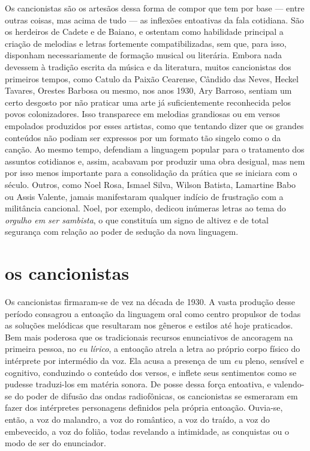 Os cancionistas são os artesãos dessa forma de compor que tem por base
--- entre outras coisas, mas acima de tudo --- as inflexões entoativas
da fala cotidiana. São os herdeiros de Cadete e de Baiano, e ostentam
como habilidade principal a criação de melodias e letras fortemente
compatibilizadas, sem que, para isso, disponham necessariamente de
formação musical ou literária. Embora nada devessem à tradição escrita
da música e da literatura, muitos cancionistas dos primeiros tempos,
como Catulo da Paixão Cearense, Cândido das Neves, Heckel Tavares,
Orestes Barbosa ou mesmo, nos anos 1930, Ary Barroso, sentiam um certo
desgosto por não praticar uma arte já suficientemente reconhecida pelos
povos colonizadores. Isso transparece em melodias grandiosas ou em
versos empolados produzidos por esses artistas, como que tentando dizer
que os grandes conteúdos não podiam ser expressos por um formato tão
singelo como o da canção. Ao mesmo tempo, defendiam a linguagem popular
para o tratamento dos assuntos cotidianos e, assim, acabavam por
produzir uma obra desigual, mas nem por isso menos importante para a
consolidação da prática que se iniciara com o século. Outros, como Noel
Rosa, Ismael Silva, Wilson Batista, Lamartine Babo ou Assis Valente,
jamais manifestaram qualquer indício de frustração com a militância
cancional. Noel, por exemplo, dedicou inúmeras letras ao tema do
\textit{orgulho em ser sambista}, o que constituía um signo de altivez e de
total segurança com relação ao poder de sedução da nova linguagem.

\section{os cancionistas}

Os cancionistas firmaram-se de vez na década de 1930. A vasta produção
desse período consagrou a entoação da linguagem oral como centro
propulsor de todas as soluções melódicas que resultaram nos gêneros e
estilos até hoje praticados. Bem mais poderosa que os tradicionais
recursos enunciativos de ancoragem na primeira pessoa, no \textit{eu lírico},
a entoação atrela a letra ao próprio corpo físico do intérprete por
intermédio da voz. Ela acusa a presença de um \textit{eu} pleno, sensível e
cognitivo, conduzindo o conteúdo dos versos, e inflete seus sentimentos
como se pudesse traduzi-los em matéria sonora. De posse dessa força
entoativa, e valendo-se do poder de difusão das ondas radiofônicas, os
cancionistas se esmeraram em fazer dos intérpretes personagens definidos
pela própria entoação. Ouvia-se, então, a voz do malandro, a voz do
romântico, a voz do traído, a voz do embevecido, a voz do folião, todas
revelando a intimidade, as conquistas ou o modo de ser do enunciador.

